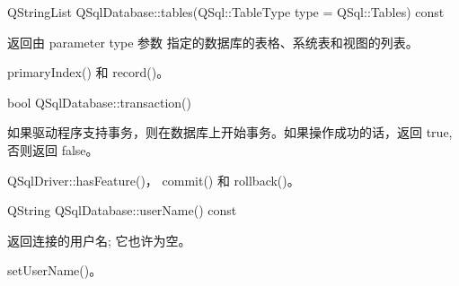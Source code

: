QStringList QSqlDatabase::tables(QSql::TableType type = QSql::Tables) const

返回由 parameter type 参数 指定的数据库的表格、系统表和视图的列表。

\begin{seeAlso}
primaryIndex() 和 record()。
\end{seeAlso}

bool QSqlDatabase::transaction()

如果驱动程序支持事务，则在数据库上开始事务。如果操作成功的话，返回 true, 否则返回 false。

\begin{seeAlso}
QSqlDriver::hasFeature()， commit() 和 rollback()。
\end{seeAlso}

QString QSqlDatabase::userName() const

返回连接的用户名; 它也许为空。

\begin{seeAlso}
setUserName()。
\end{seeAlso}

